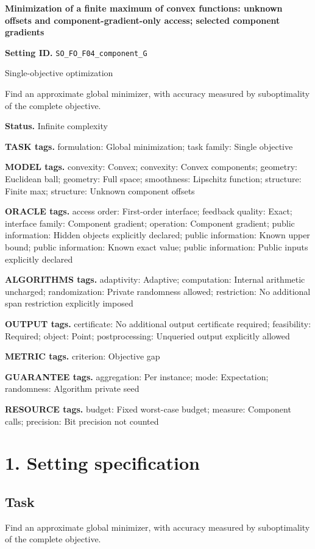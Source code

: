 \documentclass[10pt,a4paper]{article}
\begin{document}
\raggedright

{\LARGE\bfseries\sffamily\color{AtlasNavy} Minimization of a finite maximum of convex functions: unknown offsets and component-gradient-only access; selected component gradients\par}\vspace{5pt}
\textbf{Setting ID.} \texttt{SO\_\allowbreak{}FO\_\allowbreak{}F04\_\allowbreak{}component\_\allowbreak{}G}

Single-objective optimization

Find an approximate global minimizer, with accuracy measured by suboptimality of the complete objective.

\textbf{Status.} Infinite complexity

\textbf{TASK tags.} formulation: Global minimization; task family: Single objective

\textbf{MODEL tags.} convexity: Convex; convexity: Convex components; geometry: Euclidean ball; geometry: Full space; smoothness: Lipschitz function; structure: Finite max; structure: Unknown component offsets

\textbf{ORACLE tags.} access order: First-order interface; feedback quality: Exact; interface family: Component gradient; operation: Component gradient; public information: Hidden objects explicitly declared; public information: Known upper bound; public information: Known exact value; public information: Public inputs explicitly declared

\textbf{ALGORITHMS tags.} adaptivity: Adaptive; computation: Internal arithmetic uncharged; randomization: Private randomness allowed; restriction: No additional span restriction explicitly imposed

\textbf{OUTPUT tags.} certificate: No additional output certificate required; feasibility: Required; object: Point; postprocessing: Unqueried output explicitly allowed

\textbf{METRIC tags.} criterion: Objective gap

\textbf{GUARANTEE tags.} aggregation: Per instance; mode: Expectation; randomness: Algorithm private seed

\textbf{RESOURCE tags.} budget: Fixed worst-case budget; measure: Component calls; precision: Bit precision not counted

\section{1. Setting specification}
\subsection{Task}
Find an approximate global minimizer, with accuracy measured by suboptimality of the complete objective.
\end{document}
